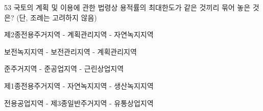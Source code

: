 \begin{question}{53}
국토의 계획 및 이용에 관한 법령상 용적률의 최대한도가 같은 것끼리 묶어 놓은 것은? (단, 조례는 고려하지 않음)
\begin{choices}
  \item 제2종전용주거지역 - 계획관리지역 - 자연녹지지역
  \item 보전녹지지역 - 보전관리지역 - 계획관리지역
  \item 준주거지역 - 준공업지역 - 근린상업지역
  \item 제1종전용주거지역 - 자연녹지지역 - 생산녹지지역
  \item 전용공업지역 - 제3종일반주거지역 - 유통상업지역
\end{choices}
\end{question}
